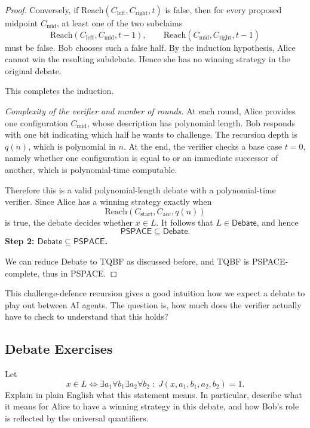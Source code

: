 \documentclass[11pt]{article}
\begin{document}
\begin{proof}
Conversely, if \(\mathrm{Reach}(C_{\mathrm{left}},C_{\mathrm{right}},t)\) is false, then for every proposed midpoint \(C_{\mathrm{mid}}\), at least one of the two subclaims
\[
\mathrm{Reach}(C_{\mathrm{left}},C_{\mathrm{mid}},t-1),
\qquad
\mathrm{Reach}(C_{\mathrm{mid}},C_{\mathrm{right}},t-1)
\]
must be false. Bob chooses such a false half. By the induction hypothesis, Alice cannot win the resulting subdebate. Hence she has no winning strategy in the original debate.

This completes the induction.

\medskip

\noindent\emph{Complexity of the verifier and number of rounds.}
At each round, Alice provides one configuration \(C_{\mathrm{mid}}\), whose description has polynomial length. Bob responds with one bit indicating which half he wants to challenge. The recursion depth is \(q(n)\), which is polynomial in \(n\). At the end, the verifier checks a base case \(t=0\), namely whether one configuration is equal to or an immediate successor of another, which is polynomial-time computable.

Therefore this is a valid polynomial-length debate with a polynomial-time verifier. Since Alice has a winning strategy exactly when
\[
\mathrm{Reach}(C_{\mathrm{start}}, C_{\mathrm{acc}}, q(n))
\]
is true, the debate decides whether \(x\in L\). It follows that \(L \in \mathsf{Debate}\), and hence
\[
\mathsf{PSPACE} \subseteq \mathsf{Debate}.
\]
\medskip
\noindent\textbf{Step 2: \(\mathsf{Debate} \subseteq \mathsf{PSPACE}\).}

We can reduce Debate to TQBF as discussed before, and TQBF is PSPACE-complete, thus in PSPACE.
\end{proof}

This challenge-defence recursion gives a good intuition how we expect a debate to play out between AI agents. The question is, how much does the verifier actually have to check to understand that this holds?

\subsection{Debate Exercises}

\begin{exercise}
\label{ex:ex2}
Let
\[
x \in L \iff \exists a_1 \forall b_1 \exists a_2 \forall b_2 \;:\; J(x,a_1,b_1,a_2,b_2)=1.
\]
Explain in plain English what this statement means. In particular, describe what it means for Alice to have a winning strategy in this debate, and how Bob's role is reflected by the universal quantifiers.
\end{exercise}
\end{document}
